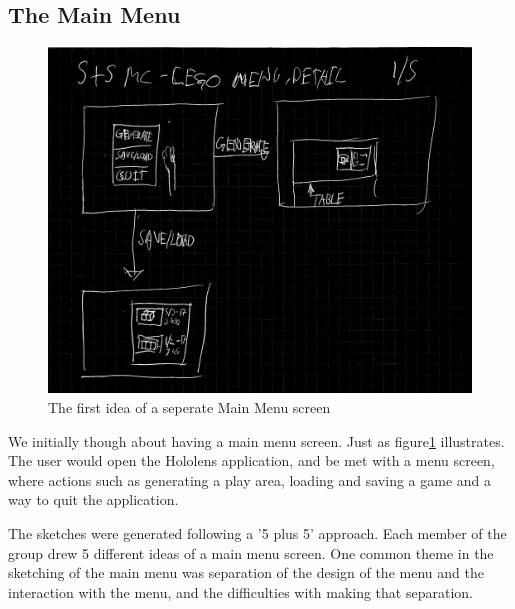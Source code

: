 \subsection{The Main Menu}
\begin{figure}[t]
	\centering
	\includegraphics[width=0.7\linewidth]{figures/Menu/menu8}
	\caption{The first idea of a seperate Main Menu screen}
	\label{fig:menu8}
\end{figure}
We initially though about having a main menu screen. Just as figure\ref{fig:menu8} illustrates. The user would open the Hololens application, and be met with a menu screen, where actions such as generating a play area, loading and saving a game and a way to quit the application. \par
The sketches were generated following a '5 plus 5' approach. Each member of the group drew 5 different ideas of a main menu screen. One common theme in the sketching of the main menu was separation of the design of the menu and the interaction with the menu, and the difficulties with making that separation.\par
